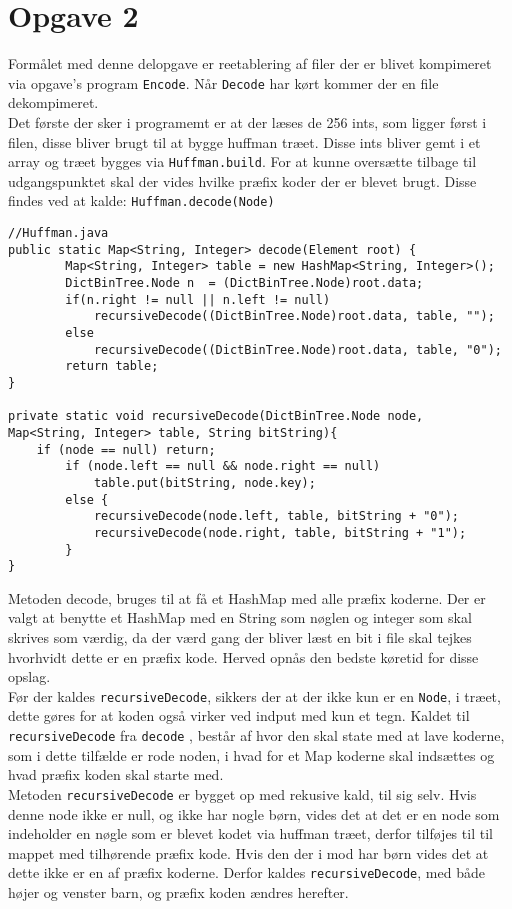 \documentclass{article}
\begin{document}
\section*{Opgave 2}
Formålet med denne delopgave er reetablering af filer der er blivet kompimeret via opgave's program \texttt{Encode}. Når \texttt{Decode} har kørt kommer der en file dekompimeret.\\
Det første der sker i programemt er at der læses de 256 ints, som ligger først i filen, disse bliver brugt til at bygge huffman træet. Disse ints bliver gemt i et array og træet bygges via \texttt{Huffman.build}. For at kunne oversætte tilbage til udgangspunktet skal der vides hvilke præfix koder der er blevet brugt. Disse findes ved at kalde: \texttt{Huffman.decode(Node)}
\begin{lstlisting}
//Huffman.java
public static Map<String, Integer> decode(Element root) {
        Map<String, Integer> table = new HashMap<String, Integer>();
        DictBinTree.Node n  = (DictBinTree.Node)root.data;
        if(n.right != null || n.left != null)
            recursiveDecode((DictBinTree.Node)root.data, table, "");
        else
            recursiveDecode((DictBinTree.Node)root.data, table, "0");
        return table;
}

private static void recursiveDecode(DictBinTree.Node node, 
Map<String, Integer> table, String bitString){
	if (node == null) return;
		if (node.left == null && node.right == null)
			table.put(bitString, node.key);
		else {
            recursiveDecode(node.left, table, bitString + "0");
            recursiveDecode(node.right, table, bitString + "1");
		}
}
\end{lstlisting}
Metoden decode, bruges til at få et HashMap med alle præfix koderne. Der er valgt at benytte et HashMap med en String som nøglen og integer som skal skrives som værdig, da der værd gang der bliver læst en bit i file skal tejkes hvorhvidt dette er en præfix kode. Herved opnås den bedste køretid for disse opslag.\\
Før der kaldes \texttt{recursiveDecode}, sikkers der at der ikke kun er en \texttt{Node}, i træet, dette gøres for at koden også virker ved indput med kun et tegn.
Kaldet til \texttt{recursiveDecode} fra \texttt{decode} , består af hvor den skal state med at lave koderne, som i dette tilfælde er rode noden, i hvad for et Map koderne skal indsættes og hvad præfix koden skal starte med.\\
Metoden \texttt{recursiveDecode} er bygget op med rekusive kald, til sig selv. Hvis denne node ikke er null, og ikke har nogle børn, vides det at det er en node som indeholder en nøgle som er blevet kodet via huffman træet, derfor tilføjes til til mappet med tilhørende præfix kode. Hvis den der i mod har børn vides det at dette ikke er en af præfix koderne. Derfor kaldes \texttt{recursiveDecode}, med både højer og venster barn, og præfix koden ændres herefter.\\
\end{document}
